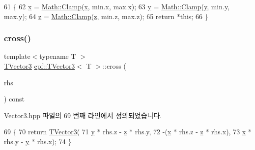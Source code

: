 \begin{DoxyCode}
61                                                     \{
62             \hyperlink{classcpf_1_1_t_vector3_ad3df42808358a64c518d6349ede446d8}{x} = \hyperlink{classcpf_1_1_math_af254e4be01c64cf73906a0edf3c091e2}{Math::Clamp}(\hyperlink{classcpf_1_1_t_vector3_ad3df42808358a64c518d6349ede446d8}{x}, min.x, max.x);
63             \hyperlink{classcpf_1_1_t_vector3_a2371a0583e76dcc80c6f10dd168cde1b}{y} = \hyperlink{classcpf_1_1_math_af254e4be01c64cf73906a0edf3c091e2}{Math::Clamp}(\hyperlink{classcpf_1_1_t_vector3_a2371a0583e76dcc80c6f10dd168cde1b}{y}, min.y, max.y);
64             \hyperlink{classcpf_1_1_t_vector3_ae7ea5f4b24c3438a44eb6b0fdfe02823}{z} = \hyperlink{classcpf_1_1_math_af254e4be01c64cf73906a0edf3c091e2}{Math::Clamp}(\hyperlink{classcpf_1_1_t_vector3_ae7ea5f4b24c3438a44eb6b0fdfe02823}{z}, min.z, max.z);
65             \textcolor{keywordflow}{return} *\textcolor{keyword}{this};
66         \}
\end{DoxyCode}
\mbox{\label{classcpf_1_1_t_vector3_ab8bf3f6455758ae7739a2a1f6ca8024c}} 
\subsubsection{\texorpdfstring{cross()}{cross()}}
{\footnotesize\ttfamily template$<$typename T $>$ \\
\hyperlink{classcpf_1_1_t_vector3}{T\+Vector3} \hyperlink{classcpf_1_1_t_vector3}{cpf\+::\+T\+Vector3}$<$ T $>$\+::cross (\begin{DoxyParamCaption}\item[{const \hyperlink{classcpf_1_1_t_vector3}{T\+Vector3}$<$ T $>$ \&}]{rhs }\end{DoxyParamCaption}) const\hspace{0.3cm}{\ttfamily [inline]}}



Vector3.\+hpp 파일의 69 번째 라인에서 정의되었습니다.


\begin{DoxyCode}
69                                                   \{
70             \textcolor{keywordflow}{return} \hyperlink{classcpf_1_1_t_vector3_a31544bebbd3d8737adf44460256b57fd}{TVector3}(
71                     \hyperlink{classcpf_1_1_t_vector3_a2371a0583e76dcc80c6f10dd168cde1b}{y} * rhs.z - \hyperlink{classcpf_1_1_t_vector3_ae7ea5f4b24c3438a44eb6b0fdfe02823}{z} * rhs.y,
72                     -(\hyperlink{classcpf_1_1_t_vector3_ad3df42808358a64c518d6349ede446d8}{x} * rhs.z - \hyperlink{classcpf_1_1_t_vector3_ae7ea5f4b24c3438a44eb6b0fdfe02823}{z} * rhs.x),
73                     \hyperlink{classcpf_1_1_t_vector3_ad3df42808358a64c518d6349ede446d8}{x} * rhs.y - \hyperlink{classcpf_1_1_t_vector3_a2371a0583e76dcc80c6f10dd168cde1b}{y} * rhs.x);
74         \}
\end{DoxyCode}
\mbox{\label{classcpf_1_1_t_vector3_a36faa29b2520d8db8c821f9c3eb9962b}} 
